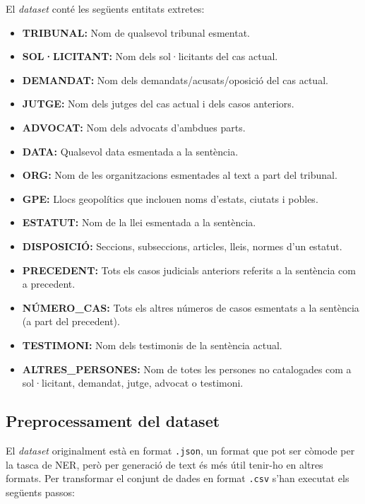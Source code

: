 El \textit{dataset} conté les següents entitats extretes:
\begin{itemize}
  \item \textbf{TRIBUNAL:} Nom de qualsevol tribunal esmentat.
  \item \textbf{SOL·LICITANT:} Nom dels sol·licitants del cas actual.
  \item \textbf{DEMANDAT:} Nom dels demandats/acusats/oposició del cas actual.
  \item \textbf{JUTGE:} Nom dels jutges del cas actual i dels casos anteriors.
  \item \textbf{ADVOCAT:} Nom dels advocats d'ambdues parts.
  \item \textbf{DATA:} Qualsevol data esmentada a la sentència.
  \item \textbf{ORG:} Nom de les organitzacions esmentades al text a part del tribunal.
  \item \textbf{GPE:} Llocs geopolítics que inclouen noms d'estats, ciutats i pobles.
  \item \textbf{ESTATUT:} Nom de la llei esmentada a la sentència.
  \item \textbf{DISPOSICIÓ:} Seccions, subseccions, articles, lleis, normes d'un estatut.
  \item \textbf{PRECEDENT:} Tots els casos judicials anteriors referits a la sentència com a precedent.
  \item \textbf{NÚMERO\_CAS:} Tots els altres números de casos esmentats a la sentència (a part del precedent).
  \item \textbf{TESTIMONI:} Nom dels testimonis de la sentència actual.
  \item \textbf{ALTRES\_PERSONES:} Nom de totes les persones no catalogades com a \linebreak sol·licitant, demandat, jutge, advocat o testimoni.
\end{itemize}



\subsection{Preprocessament del dataset}
El \textit{dataset} originalment està en format \texttt{.json}, un format que pot ser còmode per la tasca de NER, però per generació de text és més útil tenir-ho en altres formats. Per transformar el conjunt de dades en format \texttt{.csv} s'han executat els següents passos:


